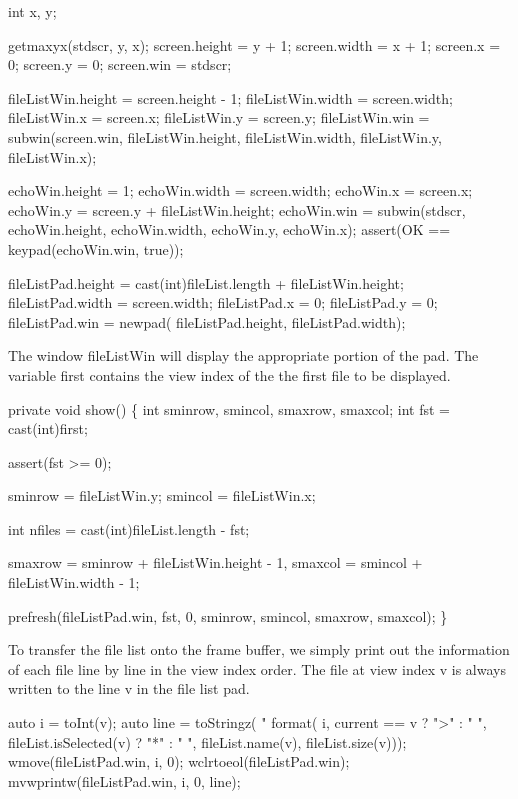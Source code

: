 \nwenddocs{}\endmoddef\nwstartdeflinemarkup\nwenddeflinemarkup
int x, y;

getmaxyx(stdscr, y, x);
screen.height = y + 1;
screen.width  = x + 1;
screen.x      = 0;
screen.y      = 0;
screen.win    = stdscr;

fileListWin.height = screen.height - 1;
fileListWin.width  = screen.width;
fileListWin.x      = screen.x;
fileListWin.y      = screen.y;
fileListWin.win    = subwin(screen.win,
  fileListWin.height,
  fileListWin.width,
  fileListWin.y,
  fileListWin.x);

echoWin.height = 1;
echoWin.width  = screen.width;
echoWin.x      = screen.x;
echoWin.y      = screen.y + fileListWin.height;
echoWin.win    = subwin(stdscr,
  echoWin.height,
  echoWin.width,
  echoWin.y,
  echoWin.x);
assert(OK == keypad(echoWin.win, true));

fileListPad.height = cast(int)fileList.length + fileListWin.height;
fileListPad.width  = screen.width;
fileListPad.x      = 0;
fileListPad.y      = 0;
fileListPad.win    = newpad(
  fileListPad.height,
  fileListPad.width);

\nwendcode{}The window {\Tt{}fileListWin\nwendquote} will display the appropriate portion of
the pad. The variable {\Tt{}first\nwendquote} contains the view index of the the
first file to be displayed.

\nwenddocs{}\endmoddef\nwstartdeflinemarkup\nwenddeflinemarkup
private void show() \{
  int sminrow, smincol, smaxrow, smaxcol;
  int fst = cast(int)first;

  assert(fst >= 0);

  sminrow = fileListWin.y;
  smincol = fileListWin.x;
  
  int nfiles = cast(int)fileList.length - fst;

  smaxrow = sminrow + fileListWin.height - 1,
  smaxcol = smincol + fileListWin.width  - 1;
  
  prefresh(fileListPad.win,
           fst,
           0,
           sminrow,
           smincol,
           smaxrow,
           smaxcol);
\}

\nwendcode{}To transfer the file list onto the frame buffer, we simply print out
the information of each file line by line in the view index order. The
file at view index {\Tt{}v\nwendquote} is always written to the line {\Tt{}v\nwendquote} in the
file list pad.

\nwenddocs{}\endmoddef\nwstartdeflinemarkup\nwenddeflinemarkup
auto i = toInt(v);
auto line = toStringz(
  "%
    format(
      i,
      current == v ? ">" : " ",
      fileList.isSelected(v) ? "*" : " ",
      fileList.name(v),
      fileList.size(v)));
wmove(fileListPad.win, i, 0);
wclrtoeol(fileListPad.win);
mvwprintw(fileListPad.win, i, 0, line);

